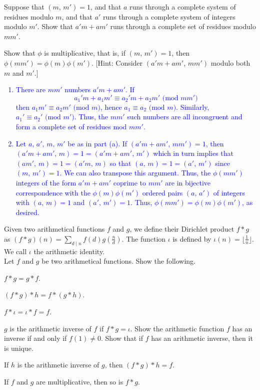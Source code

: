 \documentclass[a4paper,11pt]{article}
\theoremstyle{mythm}
\theoremstyle{mydef}
\newcommand{\blue}[1]{\textcolor{blue}{#1}}
\renewcommand{\pmod}[1]{\text{ (mod $#1$)}}
\begin{document}
\begin{enumerate*}[{\bf (a)}]
\item Suppose that $(m,\,m')=1$, and that $a$ runs through a complete system of
  residues modulo $m$, and that $a'$ runs through a complete system of integers
  modulo $m'$. Show that $a'm+am'$ runs through a complete set of residues
  modulo $mm'$.
\item Show that $\phi$ is multiplicative, that is, if $(m,\,m')=1$, then
  $\phi(mm')=\phi(m)\phi(m')$. [Hint: Consider $(a'm+am',\,mm')$ modulo both $m$
  and $m'$.]
\end{enumerate*}

\blue{
  \begin{enumerate}[{\bf (a)}]
  \item There are $mm'$ numbers $a'm+am'$. If
    \[
      a_1'm+a_1m' \equiv a_2'm+a_2m' \pmod{mm'}
    \]
    then $a_1m' \equiv a_2m' \pmod{m}$, hence $a_1 \equiv a_2 \pmod{m}$.
    Similarly, $a_1' \equiv a_2' \pmod{m'}$. Thus, the $mm'$ such numbers are
    all incongruent and form a complete set of residues mod $mm'$.
  \item Let $a,\,a',\,m,\,m'$ be as in part (a). If $(a'm+am',\,mm')=1$, then
    $(a'm+am',\,m)=1=(a'm+am',\,m')$ which in turn implies that
    $(am',\,m)=1=(a'm,\,m)$ so that $(a,\,m)=1=(a',\,m')$ since $(m,\,m')=1$. We
    can also transpose this argument. Thus, the $\phi(mm')$ integers of the form
    $a'm+am'$ coprime to $mm'$ are in bijective correspondence with the
    $\phi(m)\phi(m')$ ordered pairs $(a,\,a')$ of integers with $(a,\,m)=1$ and
    $(a',\,m')=1$. Thus, $\phi(mm')=\phi(m)\phi(m')$, as desired.
  \end{enumerate}
}

Given two arithmetical functions $f$ and $g$, we define their Dirichlet product
$f*g$ as $(f*g)(n)=\sum_{d \mid n}f(d)g(\frac{n}{d})$. The function $\iota$ is
defined by $\iota(n)=\lfloor \frac{1}{n} \rfloor$. We call $\iota$ the
arithmetic identity. \\

 Let $f$ and $g$ be two arithmetical functions. Show
the following.
\begin{enumerate*}[{\bf (a)}]
\item $f*g = g*f$.
\item $(f*g)*h=f*(g*h)$.
\item $f*\iota = \iota*f=f$.
\item $g$ is the arithmetic inverse of $f$ if $f*g=\iota$. Show the arithmetic
  function $f$ has an inverse if and only if $f(1) \neq 0$. Show that if $f$ has
  an arithmetic inverse, then it is unique.
\item If $h$ is the arithmetic inverse of $g$, then $(f*g)*h=f$.
\item If $f$ and $g$ are multiplicative, then so is $f*g$.
\end{enumerate*}
\end{document}
